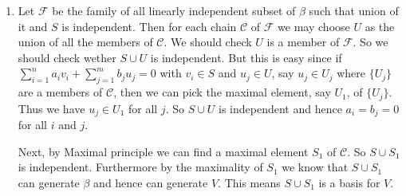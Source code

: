 \begin{enumerate}
\item Let $\mathscr{F}$ be the family of all linearly independent subset of $\beta $ such that union of it and $S$ is independent. Then for each chain $\mathscr{C}$ of $\mathscr{F}$ we may choose $U$ as the union of all the members of $\mathscr{C}$. We should check $U$ is a member of $\mathscr{F}$. So we should check wether $S\cup U$ is independent. But this is easy since if $\sum_{i=1}^n{a_iv_i}+\sum_{j=1}^m{b_ju_j}=0$ with $v_i\in S$ and $u_j\in U$, say $u_j\in U_j$ where $\{U_j\}$ are a members of $\mathscr{C}$, then we can pick the maximal element, say $U_1$, of $\{U_j\}$. Thus we have $u_j\in U_1$ for all $j$. So $S\cup U$ is independent and hence $a_i=b_j=0$ for all $i$ and $j$.

Next, by Maximal principle we can find a maximal element $S_1$ of $\mathscr{C}$. So $S\cup S_1$ is independent. Furthermore by the maximality of $S_1$ we know that $S\cup S_1$ can generate $\beta $ and hence can generate $V$. This means $S\cup S_1$ is a basis for $V$.
\end{enumerate}